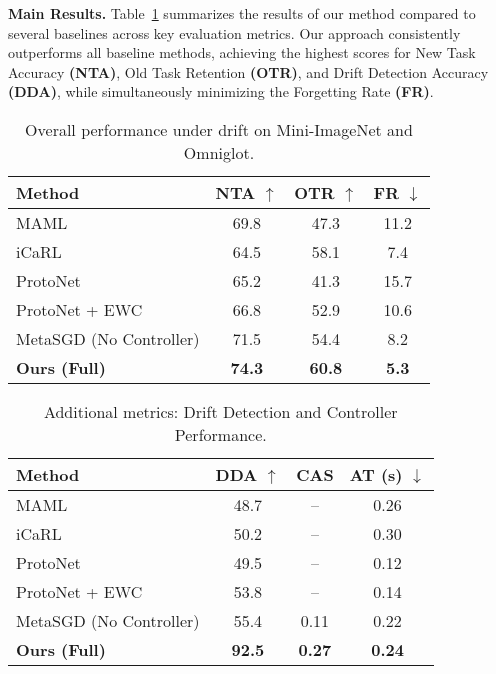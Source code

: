 \documentclass[conference]{IEEEtran}
\begin{document}
\textbf{Main Results.}  
Table~\ref{tab:main_results} summarizes the results of our method compared to several baselines across key evaluation metrics. Our approach consistently outperforms all baseline methods, achieving the highest scores for New Task Accuracy \textbf{(NTA)}, Old Task Retention \textbf{(OTR)}, and Drift Detection Accuracy \textbf{(DDA)}, while simultaneously minimizing the Forgetting Rate \textbf{(FR)}.

\begin{table}[ht]
\centering
\caption{Overall performance under drift on Mini-ImageNet and Omniglot.}
\begin{tabular}{lccc}
\toprule
\textbf{Method} & \textbf{NTA $\uparrow$} & \textbf{OTR $\uparrow$} & \textbf{FR $\downarrow$} \\
\midrule
MAML                    & 69.8  & 47.3  & 11.2 \\
iCaRL                   & 64.5  & 58.1  & 7.4  \\
ProtoNet                & 65.2  & 41.3  & 15.7 \\
ProtoNet + EWC          & 66.8  & 52.9  & 10.6 \\
MetaSGD (No Controller) & 71.5  & 54.4  & 8.2  \\
\textbf{Ours (Full)}    & \textbf{74.3}  & \textbf{60.8}  & \textbf{5.3}  \\
\bottomrule
\end{tabular}
\label{tab:main_results}
\end{table}

\begin{table}[ht]
\centering
\caption{Additional metrics: Drift Detection and Controller Performance.}
\begin{tabular}{lccc}
\toprule
\textbf{Method} & \textbf{DDA $\uparrow$} & \textbf{CAS} & \textbf{AT (s) $\downarrow$} \\
\midrule
MAML                    & 48.7  & --    & 0.26 \\
iCaRL                   & 50.2  & --    & 0.30 \\
ProtoNet                & 49.5  & --    & 0.12 \\
ProtoNet + EWC          & 53.8  & --    & 0.14 \\
MetaSGD (No Controller) & 55.4  & 0.11  & 0.22 \\
\textbf{Ours (Full)}    & \textbf{92.5} & \textbf{0.27} & \textbf{0.24} \\
\bottomrule
\end{tabular}
\end{table}
\end{document}

